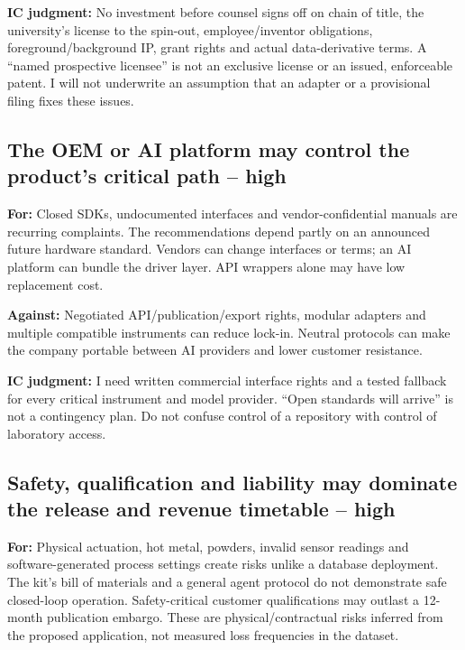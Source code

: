 \documentclass{article}
\begin{document}
\textbf{IC judgment:} No investment before counsel signs off on chain of
title, the university's license to the spin-out, employee/inventor
obligations, foreground/background IP, grant rights and actual
data-derivative terms. A ``named prospective licensee'' is not an
exclusive license or an issued, enforceable patent. I will not
underwrite an assumption that an adapter or a provisional filing fixes
these issues.

\subsection{The OEM or AI platform may control the product's critical
path --
high}\label{the-oem-or-ai-platform-may-control-the-products-critical-path-high}

\textbf{For:} Closed SDKs, undocumented interfaces and
vendor-confidential manuals are recurring complaints. The
recommendations depend partly on an announced future hardware standard.
Vendors can change interfaces or terms; an AI platform can bundle the
driver layer. API wrappers alone may have low replacement cost.
\citep{InputBrief,InputRecommendations}

\textbf{Against:} Negotiated API/publication/export rights, modular
adapters and multiple compatible instruments can reduce lock-in. Neutral
protocols can make the company portable between AI providers and lower
customer resistance.

\textbf{IC judgment:} I need written commercial interface rights and a
tested fallback for every critical instrument and model provider. ``Open
standards will arrive'' is not a contingency plan. Do not confuse
control of a repository with control of laboratory access.

\subsection{Safety, qualification and liability may dominate the release
and revenue timetable --
high}\label{safety-qualification-and-liability-may-dominate-the-release-and-revenue-timetable-high}

\textbf{For:} Physical actuation, hot metal, powders, invalid sensor
readings and software-generated process settings create risks unlike a
database deployment. The kit's bill of materials and a general agent
protocol do not demonstrate safe closed-loop operation. Safety-critical
customer qualifications may outlast a 12-month publication embargo.
These are physical/contractual risks inferred from the proposed
application, not measured loss frequencies in the dataset.
\end{document}
